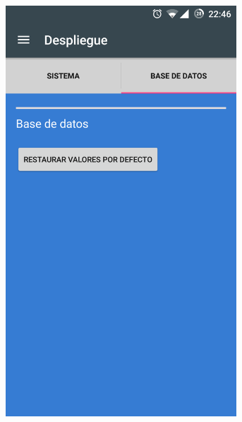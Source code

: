 \documentclass[../PFC.tex]{subfiles}
\begin{document}

\begin{figure}[H]
\centering
	\begin{subfigure}{0.32\textwidth}
		\centering
		\includegraphics[width=0.95\textwidth]{./img/app/despliegueBaseDeDatos}
    \end{subfigure}	

\end{figure}
\end{document}
